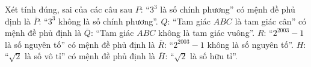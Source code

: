 \begin{ex}
Xét tính đúng, sai của các câu sau
\choiceTF
{\True $P$: ``$3^3$ là số chính phương'' có mệnh đề phủ định là $\overline P$: ``$3^3$ không là số chính phương''.}
{$Q$: ``Tam giác $ABC$ là tam giác cân'' có mệnh đề phủ định là $\overline Q$: ``Tam giác $ABC$ không là tam giác vuông''.}
{\True $R$: ``$2^{2003}-1$ là số nguyên tố'' có mệnh đề phủ định là $\overline R$: ``$2^{2003}-1$ không là số nguyên tố''.}
{\True $H$: ``$\sqrt2$ là số vô tỉ'' có mệnh đề phủ định là $\overline H$: ``$\sqrt2$ là số hữu tỉ''.}
\end{ex}
